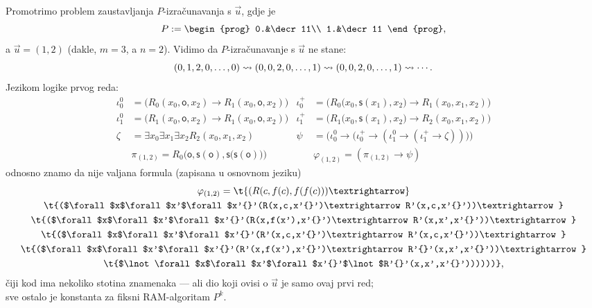 \begin{primjer}[{name=[zaustavljanje RAM-izračunavanja kao valjanost jedne formule]}]
Promotrimo problem zaustavljanja $P$-izračunavanja s $\vec u$, gdje je
\begin{equation}
    P:=\begin{prog}
    0.&\decr11\\
    1.&\decr11
    \end{prog}\text,
\end{equation}
    a $\vec u=(1,2)$ (dakle, $m=3$, a $n=2$). Vidimo da $P$-izračunavanje s $\vec u$ ne stane:
\begin{equation}
    (0,1,2,0,\dotsc,0)\leadsto(0,0,2,0,\dotsc,1)\leadsto(0,0,2,0,\dotsc,1)\leadsto\dotsb\text.
\end{equation}
Jezikom logike prvog reda:
\begin{align}
	\iota_0^0&=\bigl(R_0(x_0,\mathsf o,x_2)\to R_1(x_0,\mathsf o,x_2)\bigr)&
    \iota_0^+&=\bigl(R_0\bigl(x_0,\mathsf s(x_1),x_2\bigr)\to R_1(x_0,x_1,x_2)\bigr)\\
	\iota_1^0&=\bigl(R_1(x_0,\mathsf o,x_2)\to R_1(x_0,\mathsf o,x_2)\bigr)&
    \iota_1^+&=\bigl(R_1\bigl(x_0,\mathsf s(x_1),x_2\bigr)\to R_2(x_0,x_1,x_2)\bigr)\\
	\zeta&=\exists x_0\exists x_1\exists x_2 R_2(x_0,x_1,x_2)&
    \psi&=\bigl(\iota_0^0\to\bigl(\iota_0^+\to(\iota_1^0\to(\iota_1^+\to\zeta))\bigl)\bigl)\\
	&\pi_{(1,2)}=R_0\bigl(\mathsf o,\mathsf s(\mathsf o),\mathsf s\bigl(\mathsf s(\mathsf o)\bigr)\bigr)&
	&\varphi_{(1,2)}=(\pi_{(1,2)}\to\psi)
\end{align}
    odnosno znamo da nije valjana formula (zapisana u osnovnom jeziku)
\begin{multline}
    \varphi_{(1,2)}=\t{(R(c,f(c),f(f(c)))\textrightarrow}\\
    \t{($\forall$x$\forall$x'$\forall$x'{}'(R(x,c,x'{}')\textrightarrow R'(x,c,x'{}'))\textrightarrow}\\
    \t{($\forall$x$\forall$x'$\forall$x'{}'(R(x,f(x'),x'{}')\textrightarrow R'(x,x',x'{}'))\textrightarrow}\\
    \t{($\forall$x$\forall$x'$\forall$x'{}'(R'(x,c,x'{}')\textrightarrow R'(x,c,x'{}'))\textrightarrow}\\
    \t{($\forall$x$\forall$x'$\forall$x'{}'(R'(x,f(x'),x'{}')\textrightarrow R'{}'(x,x',x'{}'))\textrightarrow}\\
    \t{$\lnot\forall$x$\forall$x'$\forall$x'{}'$\lnot$R'{}'(x,x',x'{}'))))))}\text,
\end{multline}
čiji kod ima nekoliko stotina znamenaka --- ali dio koji ovisi o $\vec u$ je samo ovaj prvi red;\\ sve ostalo je konstanta za fiksni RAM-algoritam $P^k$.
\end{primjer}

